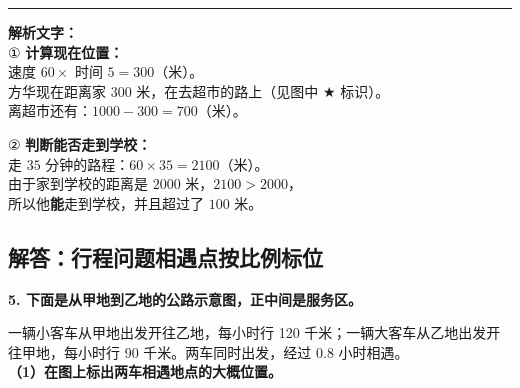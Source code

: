 \vspace{1.2cm}
\hrule
\vspace{0.4cm}

{\small\color{gray}
\textbf{解析文字：}\\
① \textbf{计算现在位置：}\\
速度 $60 \times$ 时间 $5 = 300$（米）。\\
方华现在距离家 $300$ 米，在去超市的路上（见图中 $\bigstar$ 标识）。\\
离超市还有：$1000 - 300 = 700$（米）。

\vspace{0.3cm}
② \textbf{判断能否走到学校：}\\
走 $35$ 分钟的路程：$60 \times 35 = 2100$（米）。\\
由于家到学校的距离是 $2000$ 米，$2100 > 2000$，\\
所以他\textbf{能}走到学校，并且超过了 $100$ 米。
}



\newpage

\subsection{解答：行程问题相遇点按比例标位}

\vspace{0.4cm}

\noindent\textbf{5. 下面是从甲地到乙地的公路示意图，正中间是服务区。}

\vspace{0.4cm}
\begin{center}
\end{center}
\vspace{0.4cm}

\noindent 一辆小客车从甲地出发开往乙地，每小时行 120 千米；一辆大客车从乙地出发开往甲地，每小时行 90 千米。两车同时出发，经过 0.8 小时相遇。\\
\textbf{（1）在图上标出两车相遇地点的大概位置。}

